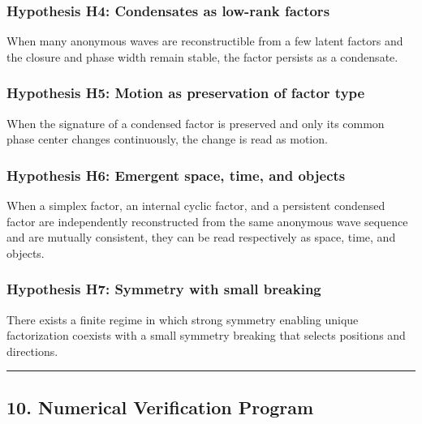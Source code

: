 \documentclass[
  a4paper,
]{article}
\begin{document}
\subsubsection{Hypothesis H4: Condensates as low-rank
factors}\label{hypothesis-h4-condensates-as-low-rank-factors}

When many anonymous waves are reconstructible from a few latent factors
and the closure and phase width remain stable, the factor persists as a
condensate.

\subsubsection{Hypothesis H5: Motion as preservation of factor
type}\label{hypothesis-h5-motion-as-preservation-of-factor-type}

When the signature of a condensed factor is preserved and only its
common phase center changes continuously, the change is read as motion.

\subsubsection{Hypothesis H6: Emergent space, time, and
objects}\label{hypothesis-h6-emergent-space-time-and-objects}

When a simplex factor, an internal cyclic factor, and a persistent
condensed factor are independently reconstructed from the same anonymous
wave sequence and are mutually consistent, they can be read respectively
as space, time, and objects.

\subsubsection{Hypothesis H7: Symmetry with small
breaking}\label{hypothesis-h7-symmetry-with-small-breaking}

There exists a finite regime in which strong symmetry enabling unique
factorization coexists with a small symmetry breaking that selects
positions and directions.

\begin{center}\rule{0.5\linewidth}{0.5pt}\end{center}

\subsection{10. Numerical Verification
Program}\label{numerical-verification-program}
\end{document}
